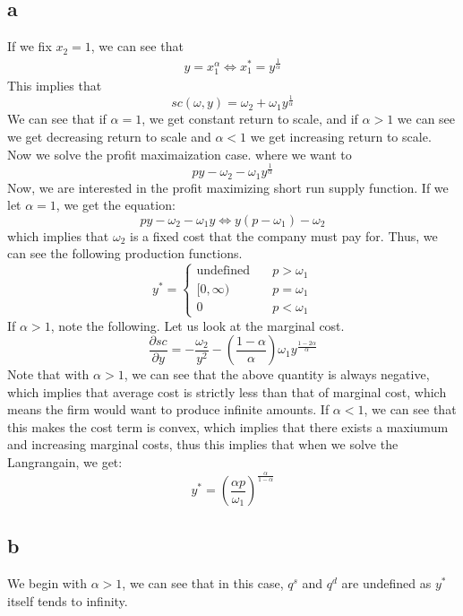\documentclass[11pt]{article}
\begin{document}
\subsection*{a}
If we fix $x_2 = 1$, we can see that 
\begin{align*}
    y = x^\alpha_1 \iff x_1^* = y^\frac{1}{\alpha}
\end{align*} 
This implies that 
\[
sc(\omega, y) = \omega_2 + \omega_1 y^\frac{1}{\alpha}
\]
We can see that if $\alpha = 1$, we get constant return to scale, and if $\alpha > 1$ we can see we get decreasing return to scale and $\alpha < 1$ we get increasing return to scale. Now we solve the profit maximaization case. where we want to 
\[
py - \omega_2 - \omega_1 y^\frac{1}{\alpha}
\]
Now, we are interested in the profit maximizing short run supply function. 
If we let $\alpha = 1$, we get the equation:
\[
py - \omega_2 - \omega_1 y \iff y(p - \omega_1) - \omega_2
\]
which implies that $\omega_2$ is a fixed cost that the company must pay for. Thus, we can see the following production functions.
\[
y^* = \begin{cases}
    \text{undefined} & \quad p > \omega_1\\
    [0,\infty) & \quad p = \omega_1\\
    0 & \quad p < \omega_1
\end{cases}
\]
If $\alpha > 1$, note the following. Let us look at the marginal cost. 
\[
\frac{\partial sc}{\partial y} = -\frac{\omega_2}{y^2} - \left( \frac{1-\alpha}{\alpha} \right)\omega_1 y^\frac{1- 2\alpha}{\alpha}
\]
Note that with $\alpha >1$, we can see that the above quantity is always negative, which implies that average cost is strictly less than that of marginal cost, which means the firm would want to produce infinite amounts. If $\alpha < 1$, we can see that this makes the cost term is convex, which implies that there exists a maxiumum and increasing marginal costs, thus this implies that when we solve the Langrangain, we get:
\[
y^* = \left( \frac{\alpha p}{\omega_1} \right)^\frac{\alpha}{1-\alpha}
\]
\subsection*{b}
We begin with $\alpha > 1$, we can see that in this case, $q^s$ and $q^d$ are undefined as $y^*$ itself tends to infinity. 
\end{document}
